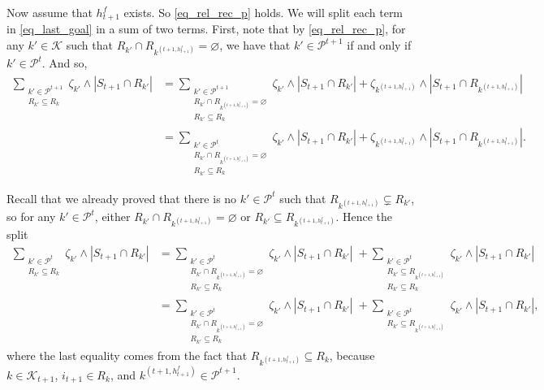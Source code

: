 \documentclass[
  11pt,
  a4paper,
]{article}
\theoremstyle{plain}
\theoremstyle{definition}
\theoremstyle{plain}
\theoremstyle{definition}
\theoremstyle{plain}
\theoremstyle{remark}
\begin{document}
Now assume that \(h^f_{t+1}\) exists. So \eqref{eq_rel_rec_p} holds. We
will split each term in \eqref{eq_last_goal} in a sum of two terms.
First, note that by \eqref{eq_rel_rec_p}, for any \(k'\in\mathcal{K}\)
such that \(R_{k'}\cap  R_{  k^{(t+1,h^f_{t+1})} } = \varnothing\), we
have that \(k'\in\mathcal{P}^{t+1}\) if and only if
\(k'\in \mathcal{P}^{t}\). And so, \begin{align*}
 \sum_{\substack{k'\in\mathcal{P}^{t+1}\\R_{k'}\subseteq R_k}} \zeta_{k'}\wedge |S_{t+1}\cap R_{k'}| &=  \sum_{\substack{k'\in\mathcal{P}^{t+1}\\R_{k'}\cap  R_{  k^{(t+1,h^f_{t+1})} } = \varnothing \\R_{k'}\subseteq R_k }} \zeta_{k'}\wedge |S_{t+1}\cap R_{k'}| +  \zeta_{ k^{(t+1,h^f_{t+1})}}\wedge |S_{t+1}\cap R_{ k^{(t+1,h^f_{t+1})}}|\\ 
 &=  \sum_{\substack{k'\in\mathcal{P}^{t}\\R_{k'}\cap  R_{  k^{(t+1,h^f_{t+1})} } = \varnothing \\R_{k'}\subseteq R_k }} \zeta_{k'}\wedge |S_{t+1}\cap R_{k'}| +  \zeta_{ k^{(t+1,h^f_{t+1})}}\wedge |S_{t+1}\cap R_{ k^{(t+1,h^f_{t+1})}}|.
\end{align*}

Recall that we already proved that there is no \(k'\in \mathcal{P}^t\)
such that \(R_{  k^{(t+1,h^f_{t+1})} }\subsetneq R_{k'}\), so for any
\(k'\in \mathcal{P}^t\), either
\(R_{k'}\cap  R_{  k^{(t+1,h^f_{t+1})} } = \varnothing\) or
\(R_{k'}\subseteq  R_{  k^{(t+1,h^f_{t+1})}}\). Hence the split
\begin{align*}
 \sum_{\substack{k'\in\mathcal{P}^{t}\\R_{k'}\subseteq R_k}} \zeta_{k'}\wedge |S_{t+1}\cap R_{k'}| &=  \sum_{\substack{k'\in\mathcal{P}^{t}\\R_{k'}\cap  R_{  k^{(t+1,h^f_{t+1})} } = \varnothing \\R_{k'}\subseteq R_k }} \zeta_{k'}\wedge |S_{t+1}\cap R_{k'}|  \;   + \sum_{\substack{k'\in\mathcal{P}^{t}\\R_{k'}\subseteq  R_{  k^{(t+1,h^f_{t+1})}}\\ R_{k'}\subseteq R_k}} \zeta_{k'}\wedge |S_{t+1}\cap R_{k'}|\\
 &=\sum_{\substack{k'\in\mathcal{P}^{t}\\R_{k'}\cap  R_{  k^{(t+1,h^f_{t+1})} } = \varnothing \\R_{k'}\subseteq R_k }} \zeta_{k'}\wedge |S_{t+1}\cap R_{k'}|  \;   + \sum_{\substack{k'\in\mathcal{P}^{t}\\R_{k'}\subseteq  R_{  k^{(t+1,h^f_{t+1})}}}} \zeta_{k'}\wedge |S_{t+1}\cap R_{k'}|,
\end{align*} where the last equality comes from the fact that
\(R_{  k^{(t+1,h^f_{t+1})} }\subseteq R_k\), because
\(k\in\mathcal{K}_{t+1}\), \(i_{t+1}\in R_k\), and
\(k^{(t+1,h^f_{t+1})}\in \mathcal{P}^{t+1}\).
\end{document}

